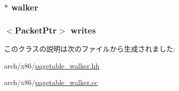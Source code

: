 \label{classX86ISA_1_1Walker_1_1WalkerState_af4dc79732f6962bb42c1d73da32ee926}
\hypertarget{classX86ISA_1_1Walker_1_1WalkerState_a54537e5fcbe2d6f609ca4c90a48a06a8}{
\subsubsection[{walker}]{$\ast$ {\bf walker}}}
\label{classX86ISA_1_1Walker_1_1WalkerState_a54537e5fcbe2d6f609ca4c90a48a06a8}
\hypertarget{classX86ISA_1_1Walker_1_1WalkerState_ad878e24435696fc6f83c7b321d1cfb37}{
\subsubsection[{writes}]{$<${\bf PacketPtr}$>$ {\bf writes}}}
\label{classX86ISA_1_1Walker_1_1WalkerState_ad878e24435696fc6f83c7b321d1cfb37}


このクラスの説明は次のファイルから生成されました:\begin{DoxyCompactItemize}
\item 
arch/x86/\hyperlink{pagetable__walker_8hh}{pagetable\_\-walker.hh}\item 
arch/x86/\hyperlink{pagetable__walker_8cc}{pagetable\_\-walker.cc}\end{DoxyCompactItemize}
